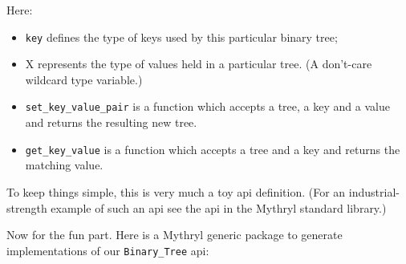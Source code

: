 Here:
\begin{itemize}
\item {\tt key} defines the type of keys used by this particular binary tree;
\item X represents the type of values held in a particular tree.  (A don't-care wildcard type variable.)
\item {\tt set\_key\_value\_pair} is a function which accepts a tree, a key and a value and returns the resulting new tree.
\item {\tt get\_key\_value} is a function which accepts a tree and a key and returns the matching value.
\end{itemize}

To keep things simple, this is very much a toy api definition.  (For an industrial-strength 
example of such an api see the  api in the Mythryl standard library.)

Now for the fun part.  Here is a Mythryl generic package to generate implementations of our 
{\tt Binary\_Tree} api:

